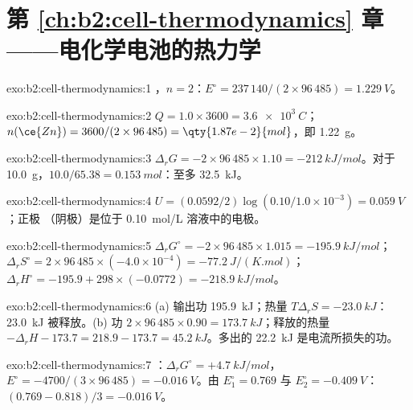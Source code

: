 \section*{第 \ref{ch:b2:cell-thermodynamics} 章——电化学电池的热力学}

\begin{solution}{exo:b2:cell-thermodynamics:1}
，$n = 2$：$E^\circ = 237\,140/(2 \times 96\,485) =
\qty{1.229}{V}$。
\end{solution}

\begin{solution}{exo:b2:cell-thermodynamics:2}
$Q = 1.0 \times 3600 = \qty{3.6e3}{C}$；$n(\ce{Zn}) = 3600/(2 \times 96\,485) =
\qty{1.87e-2}{mol}$，即 \qty{1.22}{g}。
\end{solution}

\begin{solution}{exo:b2:cell-thermodynamics:3}
$\Delta_r G = -2 \times 96\,485 \times 1.10 = \qty{-212}{kJ/mol}$。对于
\qty{10.0}{g}，$10.0/65.38 = \qty{0.153}{mol}$：至多 \qty{32.5}{kJ}。
\end{solution}

\begin{solution}{exo:b2:cell-thermodynamics:4}
$U = (0.0592/2)\log(0.10/1.0 \times 10^{-3}) = \qty{0.059}{V}$；正极
（阴极）是位于 \qty{0.10}{mol/L} 溶液中的电极。
\end{solution}

\begin{solution}{exo:b2:cell-thermodynamics:5}
$\Delta_r G^\circ = -2 \times 96\,485 \times 1.015 = \qty{-195.9}{kJ/mol}$；
$\Delta_r S^\circ = 2 \times 96\,485 \times (-4.0 \times 10^{-4}) =
\qty{-77.2}{J/(K.mol)}$；$\Delta_r H^\circ = -195.9 + 298 \times (-0.0772) =
\qty{-218.9}{kJ/mol}$。
\end{solution}

\begin{solution}{exo:b2:cell-thermodynamics:6}
(a) 输出功 \qty{195.9}{kJ}；热量 $T\Delta_r S = \qty{-23.0}{kJ}$：
\qty{23.0}{kJ} 被释放。(b) 功 $2 \times 96\,485 \times 0.90 = \qty{173.7}{kJ}$；释放的热量
$-\Delta_r H - 173.7 = 218.9 - 173.7 = \qty{45.2}{kJ}$。多出的
\qty{22.2}{kJ} 是电流所损失的功。
\end{solution}

\begin{solution}{exo:b2:cell-thermodynamics:7}
：$\Delta_r G^\circ = +\qty{4.7}{kJ/mol}$，$E^\circ =
-4700/(3 \times 96\,485) = \qty{-0.016}{V}$。由 $E_1^\circ = 0.769$ 与
$E_2^\circ = \qty{-0.409}{V}$：$(0.769 - 0.818)/3 = \qty{-0.016}{V}$。
\end{solution}

